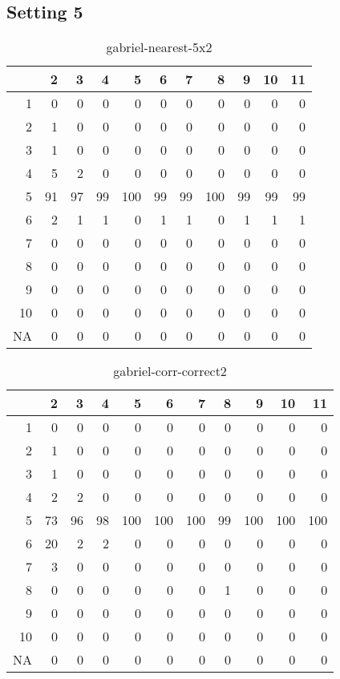 \documentclass[11pt]{article}
\begin{document}
\subsection*{Setting 5}
\begin{table}[H]
\centering
\begin{tabular}{rrrrrrrrrrr}
  \hline
 & 2 & 3 & 4 & 5 & 6 & 7 & 8 & 9 & 10 & 11 \\ 
  \hline
1 & 0 & 0 & 0 & 0 & 0 & 0 & 0 & 0 & 0 & 0 \\ 
  2 & 1 & 0 & 0 & 0 & 0 & 0 & 0 & 0 & 0 & 0 \\ 
  3 & 1 & 0 & 0 & 0 & 0 & 0 & 0 & 0 & 0 & 0 \\ 
  4 & 5 & 2 & 0 & 0 & 0 & 0 & 0 & 0 & 0 & 0 \\ 
  5 & 91 & 97 & 99 & 100 & 99 & 99 & 100 & 99 & 99 & 99 \\ 
  6 & 2 & 1 & 1 & 0 & 1 & 1 & 0 & 1 & 1 & 1 \\ 
  7 & 0 & 0 & 0 & 0 & 0 & 0 & 0 & 0 & 0 & 0 \\ 
  8 & 0 & 0 & 0 & 0 & 0 & 0 & 0 & 0 & 0 & 0 \\ 
  9 & 0 & 0 & 0 & 0 & 0 & 0 & 0 & 0 & 0 & 0 \\ 
  10 & 0 & 0 & 0 & 0 & 0 & 0 & 0 & 0 & 0 & 0 \\ 
  NA & 0 & 0 & 0 & 0 & 0 & 0 & 0 & 0 & 0 & 0 \\ 
   \hline
\end{tabular}
\caption{gabriel-nearest-5x2} 
\end{table}
\begin{table}[H]
\centering
\begin{tabular}{rrrrrrrrrrr}
  \hline
 & 2 & 3 & 4 & 5 & 6 & 7 & 8 & 9 & 10 & 11 \\ 
  \hline
1 & 0 & 0 & 0 & 0 & 0 & 0 & 0 & 0 & 0 & 0 \\ 
  2 & 1 & 0 & 0 & 0 & 0 & 0 & 0 & 0 & 0 & 0 \\ 
  3 & 1 & 0 & 0 & 0 & 0 & 0 & 0 & 0 & 0 & 0 \\ 
  4 & 2 & 2 & 0 & 0 & 0 & 0 & 0 & 0 & 0 & 0 \\ 
  5 & 73 & 96 & 98 & 100 & 100 & 100 & 99 & 100 & 100 & 100 \\ 
  6 & 20 & 2 & 2 & 0 & 0 & 0 & 0 & 0 & 0 & 0 \\ 
  7 & 3 & 0 & 0 & 0 & 0 & 0 & 0 & 0 & 0 & 0 \\ 
  8 & 0 & 0 & 0 & 0 & 0 & 0 & 1 & 0 & 0 & 0 \\ 
  9 & 0 & 0 & 0 & 0 & 0 & 0 & 0 & 0 & 0 & 0 \\ 
  10 & 0 & 0 & 0 & 0 & 0 & 0 & 0 & 0 & 0 & 0 \\ 
  NA & 0 & 0 & 0 & 0 & 0 & 0 & 0 & 0 & 0 & 0 \\ 
   \hline
\end{tabular}
\caption{gabriel-corr-correct2} 
\end{table}
\end{document}
